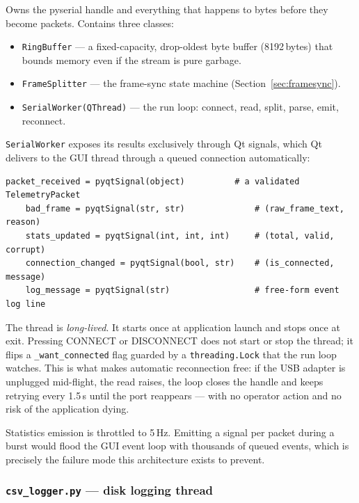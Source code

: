 \documentclass[11pt,a4paper]{article}
\newcommand{\file}[1]{\texttt{#1}}
\newcommand{\code}[1]{\texttt{#1}}
\begin{document}
Owns the pyserial handle and everything that happens to bytes before they
become packets. Contains three classes:

\begin{itemize}
  \item \code{RingBuffer} --- a fixed-capacity, drop-oldest byte buffer
        (8192\,bytes) that bounds memory even if the stream is pure garbage.
  \item \code{FrameSplitter} --- the frame-sync state machine
        (Section~\ref{sec:framesync}).
  \item \code{SerialWorker(QThread)} --- the run loop: connect, read, split,
        parse, emit, reconnect.
\end{itemize}

\code{SerialWorker} exposes its results exclusively through Qt signals, which
Qt delivers to the GUI thread through a queued connection automatically:

\begin{lstlisting}[caption={\code{SerialWorker} signal interface.},label={lst:signals}]
    packet_received = pyqtSignal(object)          # a validated TelemetryPacket
    bad_frame = pyqtSignal(str, str)              # (raw_frame_text, reason)
    stats_updated = pyqtSignal(int, int, int)     # (total, valid, corrupt)
    connection_changed = pyqtSignal(bool, str)    # (is_connected, message)
    log_message = pyqtSignal(str)                 # free-form event log line
\end{lstlisting}

The thread is \emph{long-lived}. It starts once at application launch and
stops once at exit. Pressing \textsf{CONNECT} or \textsf{DISCONNECT} does not
start or stop the thread; it flips a \code{\_want\_connected} flag guarded by
a \code{threading.Lock} that the run loop watches. This is what makes
automatic reconnection free: if the USB adapter is unplugged mid-flight, the
read raises, the loop closes the handle and keeps retrying every 1.5\,s until
the port reappears --- with no operator action and no risk of the application
dying.

Statistics emission is throttled to 5\,Hz. Emitting a signal per packet
during a burst would flood the GUI event loop with thousands of queued
events, which is precisely the failure mode this architecture exists to
prevent.

\subsubsection{\file{csv\_logger.py} --- disk logging thread}
\end{document}
